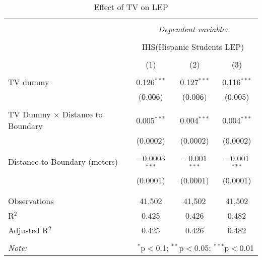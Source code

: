 
\begin{table}[!htbp] \centering 
  \caption{Effect of TV on LEP} 
  \label{} 
\begin{tabular}{@{\extracolsep{-2pt}}lccc} 
\\[-1.8ex]\hline 
\hline \\[-1.8ex] 
 & \multicolumn{3}{c}{\textit{Dependent variable:}} \\ 
\cline{2-4} 
\\[-1.8ex] & \multicolumn{3}{c}{IHS(Hispanic Students LEP)} \\ 
\\[-1.8ex] & (1) & (2) & (3)\\ 
\hline \\[-1.8ex] 
 TV dummy & 0.126$^{***}$ & 0.127$^{***}$ & 0.116$^{***}$ \\ 
  & (0.006) & (0.006) & (0.005) \\ 
  & & & \\ 
 TV Dummy $\times$ Distance to Boundary & 0.005$^{***}$ & 0.004$^{***}$ & 0.004$^{***}$ \\ 
  & (0.0002) & (0.0002) & (0.0002) \\ 
  & & & \\ 
 Distance to Boundary (meters) & $-$0.0003$^{***}$ & $-$0.001$^{***}$ & $-$0.001$^{***}$ \\ 
  & (0.0001) & (0.0001) & (0.0001) \\ 
  & & & \\ 
\hline \\[-1.8ex] 
Observations & 41,502 & 41,502 & 41,502 \\ 
R$^{2}$ & 0.425 & 0.426 & 0.482 \\ 
Adjusted R$^{2}$ & 0.425 & 0.426 & 0.482 \\ 
\hline 
\hline \\[-1.8ex] 
\textit{Note:}  & \multicolumn{3}{r}{$^{*}$p$<$0.1; $^{**}$p$<$0.05; $^{***}$p$<$0.01} \\ 
\end{tabular} 
\end{table} 
